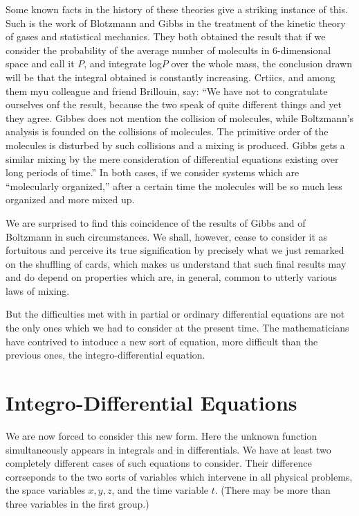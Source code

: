 \documentclass[12pt,oneside]{book}
\begin{document}
Some known facts in the history of these theories give a striking instance of this. Such is the work of Blotzmann and Gibbs in the treatment of the kinetic theory of gases and statistical mechanics. They both obtained the result that if we consider the probability of the average number of molecults in 6-dimensional space and call it $P$, and integrate log$P$ over the whole mass, the conclusion drawn will be that the integral obtained is constantly increasing. Crtiics, and among them myu colleague and friend Brillouin, say: ``We have not to congratulate ourselves onf the result, because the two speak of quite different things and yet they agree. Gibbes does not mention the collision of molecules, while Boltzmann's analysis is founded on the collisions of molecules. The primitive order of the molecules is disturbed by such collisions and a mixing is produced. Gibbs gets a similar mixing by the mere consideration of differential equations existing over long periods of time.'' In both cases, if we consider systems which are ``molecularly organized,'' after a certain time the molecules will be so much less organized and more mixed up. \par

We are surprised to find this coincidence of the results of Gibbs and of Boltzmann in such circumstances. We shall, however, cease to consider it as fortuitous and perceive its true signification by precisely what we just remarked on the shuffling of cards, which makes us understand that such final results may and do depend on properties which are, in general, common to utterly various laws of mixing. \par

But the difficulties met with in partial or ordinary differential equations are not the only ones which we had to consider at the present time. The mathematicians have contrived to intoduce a new sort of equation, more difficult than the previous ones, the integro-differential equation. \par

\section{Integro-Differential Equations}
We are now forced to consider this new form. Here the unknown function simultaneously appears in integrals and in differentials. We have at least two completely different cases of such equations to consider. Their difference corrseponds to the two sorts of variables which intervene in all physical problems, the space variables $x,y,z$, and the time variable $t$. (There may be more than three variables in the first group.) \par
\end{document}
